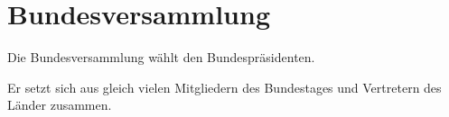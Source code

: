\documentclass{article}
\begin{document}
\section{Bundesversammlung} 
Die Bundesversammlung wählt den Bundespräsidenten.

Er setzt sich aus gleich vielen Mitgliedern des Bundestages und Vertretern des Länder zusammen.
\end{document}
